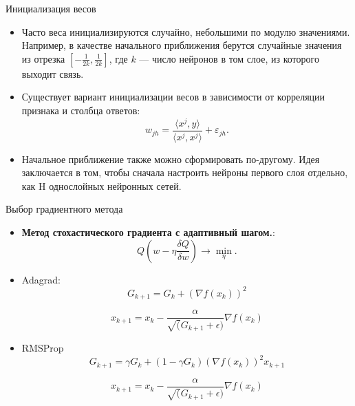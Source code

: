 \documentclass[11pt]{beamer}
\begin{document}
	\begin{frame}{Инициализация весов}
		\begin{itemize}
			\item Часто веса инициализируются случайно, небольшими по модулю значениями. Например, в качестве начального приближения берутся случайные значения из отрезка $[-\frac{1}{2k}, \frac{1}{2k}]$, где $k$ --- число нейронов в том слое, из которого выходит связь.
			\item Существует вариант инициализации весов в зависимости от корреляции признака и столбца ответов:
			\begin{equation*}
				w_{jh}=\frac{\langle x^j, y\rangle}{\langle x^j, x^j\rangle} + \varepsilon_{jh}.
			\end{equation*}
			
			\item Начальное приближение также можно сформировать по-другому. Идея заключается в том, чтобы сначала настроить нейроны первого слоя отдельно, как H однослойных нейронных сетей.
		\end{itemize}
	\end{frame}

	\begin{frame}{Выбор градиентного метода}
		\begin{itemize}
			\item \textbf{Метод стохастического градиента с адаптивный шагом.}:
			\begin{equation*}
				Q(w - \eta \frac{\delta Q}{\delta w}) \rightarrow \min_\eta.
			\end{equation*}

			\item Adagrad:
			\begin{equation*}
				G_{k+1} = G_k + (\nabla f(x_k))^2 
			\end{equation*}
			
			\begin{equation*}
				x_{k+1} = x_k - \frac{\alpha}{\sqrt(G_{k+1} + \epsilon)} \nabla f(x_k)
			\end{equation*}
			\item RMSProp
				\begin{equation*}
					G_{k+1} = \gamma G_k + (1 - \gamma G_k)(\nabla f(x_k))^2 x_{k+1}
				\end{equation*}
		
				\begin{equation*}
					x_{k+1} = x_k - \frac{\alpha}{\sqrt(G_{k+1} + \epsilon)} \nabla f(x_k)
				\end{equation*}
		\end{itemize}
	\end{frame}
	
\end{document}
